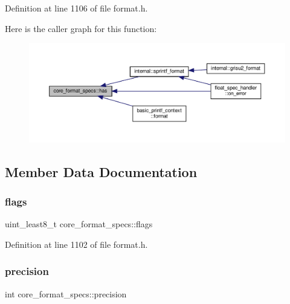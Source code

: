 Definition at line 1106 of file format.\+h.

Here is the caller graph for this function\+:
\nopagebreak
\begin{figure}[H]
\begin{center}
\leavevmode
\includegraphics[width=350pt]{structcore__format__specs_ac782db831425212c5513c61bde1c8f20_icgraph}
\end{center}
\end{figure}


\subsection{Member Data Documentation}
\mbox{\label{structcore__format__specs_af18d6b76f9ef9ea1506f0c4ac7a729ad}} 
\subsubsection{\texorpdfstring{flags}{flags}}
{\footnotesize\ttfamily uint\+\_\+least8\+\_\+t core\+\_\+format\+\_\+specs\+::flags}



Definition at line 1102 of file format.\+h.

\mbox{\label{structcore__format__specs_a52fe6e071541f34125300fad18ae6bf9}} 
\subsubsection{\texorpdfstring{precision}{precision}}
{\footnotesize\ttfamily int core\+\_\+format\+\_\+specs\+::precision}



